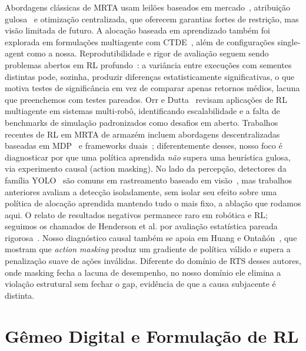 \documentclass[conference]{IEEEtran}
\begin{document}
Abordagens clássicas de MRTA usam leilões baseados em mercado~\cite{dias2006market}, atribuição gulosa~\cite{gerkey2004formal} e otimização centralizada, que oferecem garantias fortes de restrição, mas visão limitada de futuro. A alocação baseada em aprendizado também foi explorada em formulações multiagente com CTDE~\cite{lowe2017multi}, além de configurações single-agent como a nossa. Reprodutibilidade e rigor de avaliação seguem sendo problemas abertos em RL profundo~\cite{henderson2018deep}: a variância entre execuções com sementes distintas pode, sozinha, produzir diferenças estatisticamente significativas, o que motiva testes de significância em vez de comparar apenas retornos médios, lacuna que preenchemos com testes pareados. Orr e Dutta~\cite{orr2023survey} revisam aplicações de RL multiagente em sistemas multi-robô, identificando escalabilidade e a falta de benchmarks de simulação padronizados como desafios em aberto. Trabalhos recentes de RL em MRTA de armazém incluem abordagens descentralizadas baseadas em MDP~\cite{agrawal2022dcmrta} e frameworks duais~\cite{pal2025together}; diferentemente desses, nosso foco é diagnosticar por que uma política aprendida \emph{não} supera uma heurística gulosa, via experimento causal (action masking). No lado da percepção, detectores da família YOLO~\cite{yolov8} são comuns em rastreamento baseado em visão~\cite{ahmed2021topview}, mas trabalhos anteriores avaliam a detecção isoladamente, sem isolar seu efeito sobre uma política de alocação aprendida mantendo tudo o mais fixo, a ablação que rodamos aqui. O relato de resultados negativos permanece raro em robótica e RL; seguimos os chamados de Henderson et al. por avaliação estatística pareada rigorosa~\cite{henderson2018deep}. Nosso diagnóstico causal também se apoia em Huang e Ontañón~\cite{huang2022masking}, que mostram que \textit{action masking} produz um gradiente de política válido e supera a penalização suave de ações inválidas. Diferente do domínio de RTS desses autores, onde masking fecha a lacuna de desempenho, no nosso domínio ele elimina a violação estrutural sem fechar o gap, evidência de que a causa subjacente é distinta.

\section{Gêmeo Digital e Formulação de RL}
\end{document}
